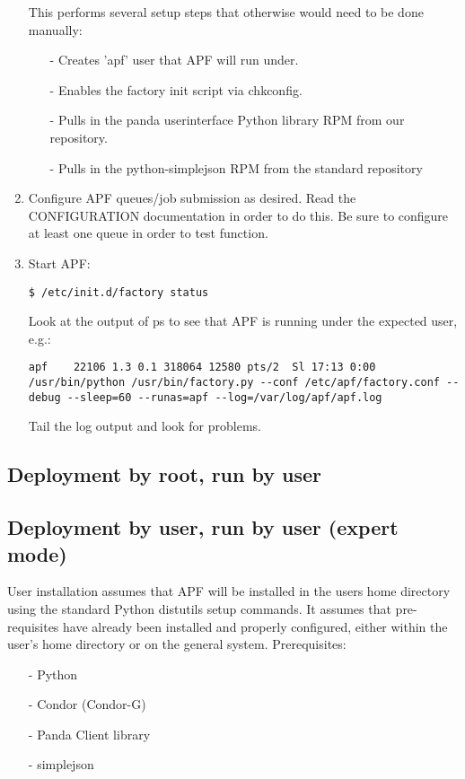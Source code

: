 \documentclass[a4paper]{jpconf}
\begin{document}
\begin{enumerate}
This performs several setup steps that otherwise would need to be done manually:
\begin{enumerate}
\item[-] Creates 'apf' user that APF will run under. 
\item[-] Enables the factory init script via chkconfig. 
\item[-] Pulls in the panda userinterface Python library RPM from our repository. 
\item[-] Pulls in the python-simplejson RPM from the standard repository
\end{enumerate}
\item Configure APF queues/job submission as desired. 
Read the CONFIGURATION documentation in order to do this. 
Be sure to configure at least one queue in order to test function.
\item Start APF:
\begin{verbatim}
$ /etc/init.d/factory status
\end{verbatim}
Look at the output of ps to see that APF is running under the expected user, e.g.:
\begin{verbatim}
apf    22106 1.3 0.1 318064 12580 pts/2  Sl 17:13 0:00 /usr/bin/python /usr/bin/factory.py --conf /etc/apf/factory.conf --debug --sleep=60 --runas=apf --log=/var/log/apf/apf.log
\end{verbatim}
Tail the log output and look for problems.
\end{enumerate}

\subsection{Deployment by root, run by user}

\subsection{Deployment by user, run by user (expert mode)}

User installation assumes that APF will be installed in the users home directory using the standard Python distutils setup commands. 
It assumes that pre-requisites have already been installed and properly configured,
either within the user's home directory or on the general system.
Prerequisites: 

\begin{enumerate}
\item[-] Python 
\item[-] Condor (Condor-G) 
\item[-] Panda Client library 
\item[-] simplejson
\end{enumerate}
\end{document}
